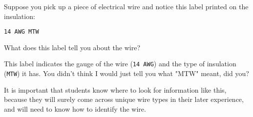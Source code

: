 

Suppose you pick up a piece of electrical wire and notice this label printed on the insulation:

\vskip 5pt

\hskip 2in
{\tt 14 AWG MTW}  

\vskip 5pt

What does this label tell you about the wire?







This label indicates the gauge of the wire ({\tt 14 AWG}) and the type of insulation ({\tt MTW}) it has.  You didn't think I would just tell you what "MTW" meant, did you?







It is important that students know where to look for information like this, because they will surely come across unique wire types in their later experience, and will need to know how to identify the wire.




